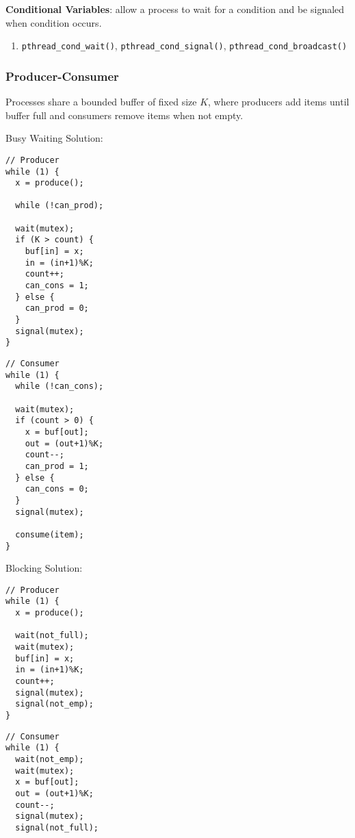 \documentclass[12pt, a4paper]{article}
\begin{document}
\begin{multicols*}{3}
\textbf{Conditional Variables}: allow a process to wait for a condition and be signaled when condition occurs.
\begin{enumerate}[\roman*.]
  \item \lstinline|pthread_cond_wait()|, \lstinline|pthread_cond_signal()|, \lstinline|pthread_cond_broadcast()|
\end{enumerate}

\colbreak
\subsubsection{Producer-Consumer}
Processes share a bounded buffer of fixed size $K$, where producers add items until buffer full and consumers remove items when not empty.

Busy Waiting Solution:\\
\begin{minipage}{0.45\columnwidth}
  \begin{lstlisting}
// Producer
while (1) {
  x = produce();

  while (!can_prod);

  wait(mutex);
  if (K > count) {
    buf[in] = x;
    in = (in+1)%K;
    count++;
    can_cons = 1;
  } else {
    can_prod = 0;
  }
  signal(mutex);
}
  \end{lstlisting}
\end{minipage}
\begin{minipage}{0.5\columnwidth}
  \begin{lstlisting}
// Consumer
while (1) {
  while (!can_cons);

  wait(mutex);
  if (count > 0) {
    x = buf[out];
    out = (out+1)%K;
    count--;
    can_prod = 1;
  } else {
    can_cons = 0;
  }
  signal(mutex);

  consume(item);
}

  \end{lstlisting}
\end{minipage}

Blocking Solution:\\
\begin{minipage}{0.45\columnwidth}
  \begin{lstlisting}
// Producer
while (1) {
  x = produce();

  wait(not_full);
  wait(mutex);
  buf[in] = x;
  in = (in+1)%K;
  count++;
  signal(mutex);
  signal(not_emp);
}
  \end{lstlisting}
\end{minipage}
\begin{minipage}{0.5\columnwidth}
  \begin{lstlisting}
// Consumer
while (1) {
  wait(not_emp);
  wait(mutex);
  x = buf[out];
  out = (out+1)%K;
  count--;
  signal(mutex);
  signal(not_full);


\end{lstlisting}
\end{minipage}
\end{multicols*}
\end{document}
